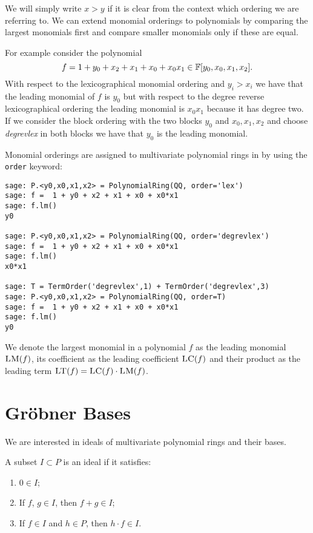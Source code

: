 We will simply write $x > y$ if it is clear from the context which ordering we are referring to. We can extend monomial orderings to polynomials by comparing the largest monomials first and compare smaller monomials only if these are equal.

For example consider the polynomial 
\[f = 1 + y_{0} + x_{2} + x_{1} + x_{0} + x_{0}x_{1} \in \mathbb{F}[y_0,x_0,x_1,x_2].\]
With respect to the lexicographical monomial ordering and $y_{i} > x_{i}$ we have that the leading monomial of $f$ is $y_{0}$ but with respect to the degree reverse lexicographical ordering the leading monomial is $x_{0}x_{1}$ because it has degree two. If we consider the block ordering with the two blocks $y_0$ and $x_0,x_1,x_2$ and choose \emph{degrevlex} in both blocks we have that $y_0$ is the leading monomial.

Monomial orderings are assigned to multivariate polynomial rings in \Sage by using the \verb|order| keyword:

\begin{lstlisting}
sage: P.<y0,x0,x1,x2> = PolynomialRing(QQ, order='lex')
sage: f =  1 + y0 + x2 + x1 + x0 + x0*x1
sage: f.lm()
y0

sage: P.<y0,x0,x1,x2> = PolynomialRing(QQ, order='degrevlex')
sage: f =  1 + y0 + x2 + x1 + x0 + x0*x1
sage: f.lm()
x0*x1

sage: T = TermOrder('degrevlex',1) + TermOrder('degrevlex',3)
sage: P.<y0,x0,x1,x2> = PolynomialRing(QQ, order=T)
sage: f =  1 + y0 + x2 + x1 + x0 + x0*x1
sage: f.lm()
y0
\end{lstlisting}

We denote the largest monomial in a polynomial $f$ as the leading monomial $\textsc{LM}(f)$, its coefficient as the leading coefficient $\textsc{LC}(f)$ and their product as the leading term $\textsc{LT}(f) = \textsc{LC}(f)\cdot \textsc{LM}(f)$.

\section{\texorpdfstring{Gröbner}{Groeber} Bases}

We are interested in ideals of multivariate polynomial rings and their bases.

\begin{definition}[Ideal]
\label{def:ideal}
A subset $I \subset P$ is an ideal if it satisfies:
\begin{enumerate}
\item $0 \in I$;
\item If $f$, $g \in I$, then $f + g \in I$;
\item If $f \in I$ and $h \in P$, then $h \cdot f \in I$.
\end{enumerate}
\end{definition}



